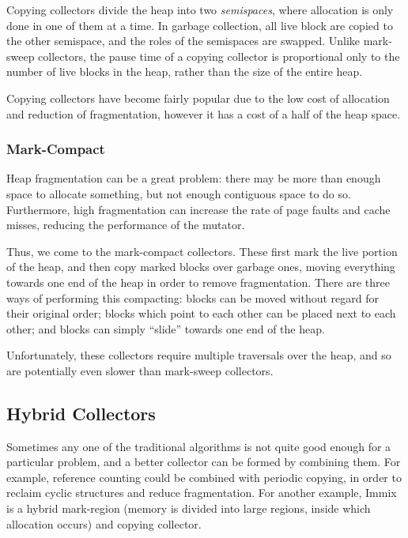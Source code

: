 Copying collectors divide the heap into two \textit{semispaces}, where
allocation is only done in one of them at a time. In garbage
collection, all live block are copied to the other semispace, and the
roles of the semispaces are swapped\cite{Fenichel69}. Unlike
mark-sweep collectors, the pause time of a copying collector is
proportional only to the number of live blocks in the heap, rather
than the size of the entire heap.

Copying collectors have become fairly popular due to the low cost of
allocation and reduction of fragmentation, however it has a cost of a
half of the heap space\cite{GarbageCollection}.

\subsubsection{Mark-Compact}

Heap fragmentation can be a great problem: there may be more than
enough space to allocate something, but not enough contiguous space to
do so. Furthermore, high fragmentation can increase the rate of page
faults and cache misses, reducing the performance of the mutator.

Thus, we come to the mark-compact collectors. These first mark the
live portion of the heap, and then copy marked blocks over garbage
ones, moving everything towards one end of the heap in order to remove
fragmentation. There are three ways of performing this compacting:
blocks can be moved without regard for their original order; blocks
which point to each other can be placed next to each other; and blocks
can simply ``slide'' towards one end of the heap.

Unfortunately, these collectors require multiple traversals over the
heap, and so are potentially even slower than mark-sweep
collectors\cite{GarbageCollection}.

\subsection{Hybrid Collectors}

Sometimes any one of the traditional algorithms is not quite good
enough for a particular problem, and a better collector can be formed
by combining them. For example, reference counting could be combined
with periodic copying, in order to reclaim cyclic structures and
reduce fragmentation. For another example, Immix\cite{Blackburn08} is
a hybrid mark-region (memory is divided into large regions, inside
which allocation occurs) and copying collector.

